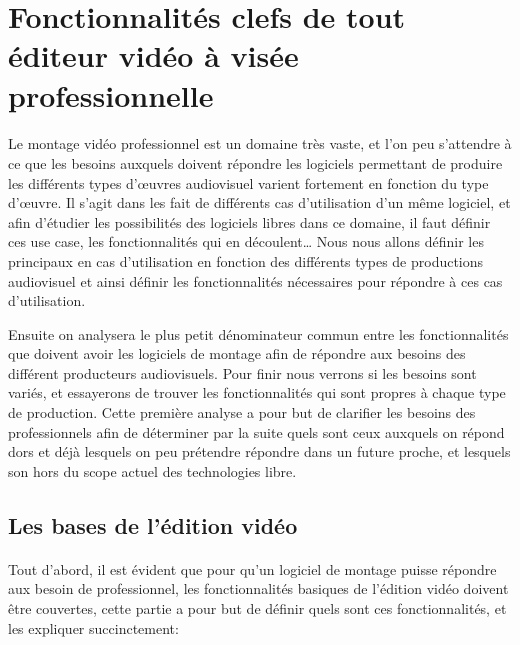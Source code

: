 \newpage
\section{Fonctionnalités clefs de tout éditeur vidéo à visée
  professionnelle}

\paragraph{}
  Le montage vidéo professionnel est un domaine très vaste, et l'on peu
  s'attendre à ce que les besoins auxquels doivent répondre les logiciels
  permettant de produire les différents types d'œuvres audiovisuel
  varient fortement en fonction du type d'œuvre. Il s'agit dans les fait
  de différents cas d'utilisation d'un même logiciel, et afin d'étudier
  les possibilités des logiciels libres dans ce domaine, il faut
  définir ces use case, les fonctionnalités qui en découlent\ldots
  Nous nous allons définir les principaux en cas d'utilisation en fonction des
  différents types de productions audiovisuel et ainsi définir les fonctionnalités
  nécessaires pour répondre à ces cas d'utilisation.

  Ensuite on analysera le plus petit dénominateur commun entre les
  fonctionnalités que doivent avoir les logiciels de montage afin de répondre
  aux besoins des différent producteurs audiovisuels. Pour finir
  nous verrons si les besoins sont variés, et essayerons de trouver les
  fonctionnalités qui sont propres à chaque type de production. Cette première
  analyse a pour but de clarifier les besoins des professionnels afin de
  déterminer par la suite quels sont ceux auxquels on répond dors et déjà %
  lesquels on peu prétendre répondre dans un future proche, et lesquels
  son hors du scope actuel des technologies libre.

  \subsection{Les bases de l'édition vidéo}
    \paragraph{}
      Tout d'abord, il est évident que pour qu'un logiciel de montage puisse répondre
      aux besoin de professionnel, les fonctionnalités basiques de l'édition vidéo
      doivent être couvertes, cette partie a pour but de définir quels sont ces
      fonctionnalités, et les expliquer succinctement:


